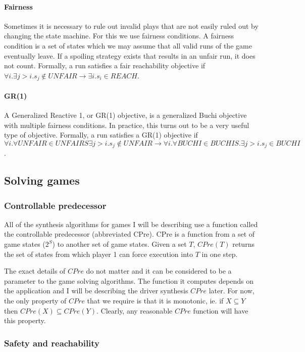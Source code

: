 \documentclass[a4paper,twoside,openright,11pt]{book}
\theoremstyle{definition}
\begin{document}
\paragraph{Fairness}
Sometimes it is necessary to rule out invalid plays that are not easily ruled out by changing the state machine. For this we use fairness conditions. A fairness condition is a set of states which we may assume that all valid runs of the game eventually leave. If a spoiling strategy exists that results in an unfair run, it does not count. Formally, a run satisfies a fair reachability objective if $\forall i. \exists j>i. s_j \notin UNFAIR \rightarrow \exists i. s_i \in REACH$. 

\paragraph{GR(1)}
A Generalized Reactive 1, or GR(1) objective, is a generalized Buchi objective with multiple fairness conditions. In practice, this turns out to be a very useful type of objective. Formally, a run satisfies a GR(1) objective if $\forall i. \forall UNFAIR \in UNFAIRS \exists j>i. s_j \notin UNFAIR \rightarrow \forall i. \forall BUCHI \in BUCHIS. \exists j>i. s_j \in BUCHI$.

\subsection{Solving games}
\subsubsection{Controllable predecessor}

All of the synthesis algorithms for games I will be describing use a function called the controllable predecessor (abbreviated CPre). CPre is a function from a set of game states ($2^S$) to another set of game states. Given a set $T$, $CPre(T)$ returns the set of states from which player 1 can force execution into $T$ in one step. 

The exact details of $CPre$ do not matter and it can be considered to be a parameter to the game solving algorithms. The function it computes depends on the application and I will be describing the driver synthesis $CPre$ later. For now, the only property of $CPre$ that we require is that it is monotonic, ie. if $X \subseteq Y$ then $CPre(X) \subseteq CPre(Y)$. Clearly, any reasonable $CPre$ function will have this property.

\subsubsection{Safety and reachability}
\end{document}
